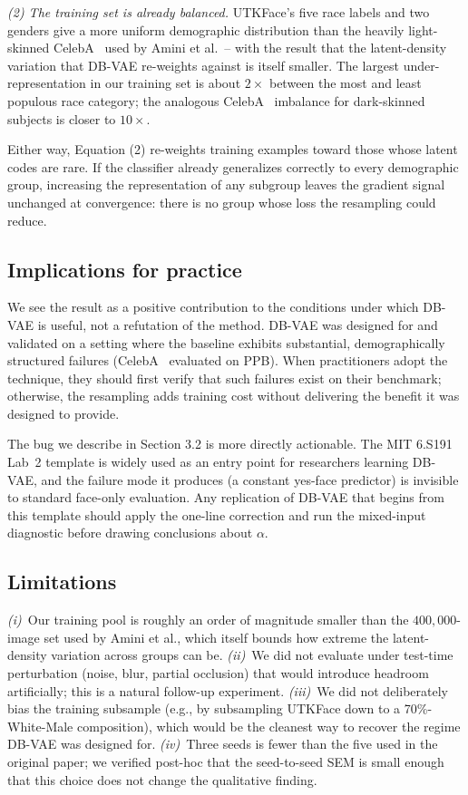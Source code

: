 \documentclass[10pt,twocolumn]{article}
\begin{document}
\emph{(2) The training set is already balanced.} UTKFace's five race
labels and two genders give a more uniform demographic distribution than
    the heavily light-skinned CelebA~\cite{liu2015celeba} used by Amini et al.\ -- with the result
that the latent-density variation that DB-VAE re-weights against is
itself smaller. The largest under-representation in our training set is
about $2 \times$ between the most and least populous race category; the
analogous CelebA~\cite{liu2015celeba} imbalance for dark-skinned subjects is closer to
$10 \times$.

Either way, Equation (2) re-weights training examples toward
those whose latent codes are rare. If the classifier already generalizes
correctly to every demographic group, increasing the representation of any
subgroup leaves the gradient signal unchanged at convergence: there is no
group whose loss the resampling could reduce.

\subsection{Implications for practice}

We see the result as a positive contribution to the conditions under
which DB-VAE is useful, not a refutation of the method. DB-VAE was
designed for and validated on a setting where the baseline exhibits
substantial, demographically structured failures (CelebA~\cite{liu2015celeba} evaluated on
PPB). When practitioners adopt the technique, they should first verify
that such failures exist on their benchmark; otherwise, the resampling
adds training cost without delivering the benefit it was designed to
provide.

The bug we describe in Section 3.2 is more directly actionable.
The MIT 6.S191 Lab~2 template is widely used as an entry point for
researchers learning DB-VAE, and the failure mode it produces (a constant
yes-face predictor) is invisible to standard face-only evaluation. Any
replication of DB-VAE that begins from this template should apply the
one-line correction and run the mixed-input diagnostic before drawing
conclusions about $\alpha$.

\subsection{Limitations}

\textit{(i)}~Our training pool is roughly an order of magnitude smaller
than the $400{,}000$-image set used by Amini et al., which itself bounds
how extreme the latent-density variation across groups can be.
\textit{(ii)}~We did not evaluate under test-time perturbation (noise,
blur, partial occlusion) that would introduce headroom artificially; this
is a natural follow-up experiment.
\textit{(iii)}~We did not deliberately bias the training subsample
(e.g., by subsampling UTKFace down to a 70\%-White-Male composition),
which would be the cleanest way to recover the regime DB-VAE was designed
for.
\textit{(iv)}~Three seeds is fewer than the five used in the original
paper; we verified post-hoc that the seed-to-seed SEM is small enough
that this choice does not change the qualitative finding.
\end{document}
